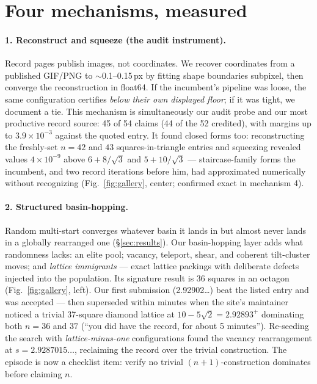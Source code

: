 \documentclass[11pt]{article}
\newcommand{\s}{\ensuremath{s}}
\begin{document}
\section{Four mechanisms, measured}\label{sec:mechanisms}

\paragraph{1. Reconstruct and squeeze (the audit instrument).}
Record pages publish images, not coordinates. We recover coordinates from a
published GIF/PNG to $\sim$0.1--0.15\,px by fitting shape boundaries subpixel,
then converge the reconstruction in float64. If the incumbent's pipeline was
loose, the same configuration certifies \emph{below their own displayed floor};
if it was tight, we document a tie. This mechanism is simultaneously our audit
probe and our most productive record source: 45 of 54 claims (44 of the 52
credited), with margins up to $3.9\times10^{-3}$ against the quoted entry. It
found closed forms too: reconstructing the freshly-set $n=42$ and $43$
squares-in-triangle entries and squeezing revealed values $4\times10^{-9}$
above $6+8/\sqrt{3}$ and $5+10/\sqrt{3}$ --- staircase-family forms the
incumbent, and two record iterations before him, had approximated numerically
without recognizing (Fig.~\ref{fig:gallery}, center; confirmed exact in
mechanism 4).

\paragraph{2. Structured basin-hopping.}
Random multi-start converges whatever basin it lands in but almost never lands
in a globally rearranged one (\S\ref{sec:results}). Our basin-hopping layer
adds what randomness lacks: an elite pool; vacancy, teleport, shear, and
coherent tilt-cluster moves; and \emph{lattice immigrants} --- exact lattice
packings with deliberate defects injected into the population. Its signature
result is 36 squares in an octagon (Fig.~\ref{fig:gallery}, left). Our first
submission (2.92902\ldots) beat
the listed entry and was accepted --- then superseded within minutes when the
site's maintainer noticed a trivial 37-square diamond lattice at
$10-5\sqrt{2}=2.92893^{+}$ dominating both $n=36$ and $37$ (``you did have the
record, for about 5 minutes''). Re-seeding the search with
\emph{lattice-minus-one} configurations found the vacancy rearrangement at
$\s=2.9287015\ldots$, reclaiming the record over the trivial construction. The
episode is now a checklist item: verify no trivial $(n{+}1)$-construction
dominates before claiming $n$.
\end{document}
